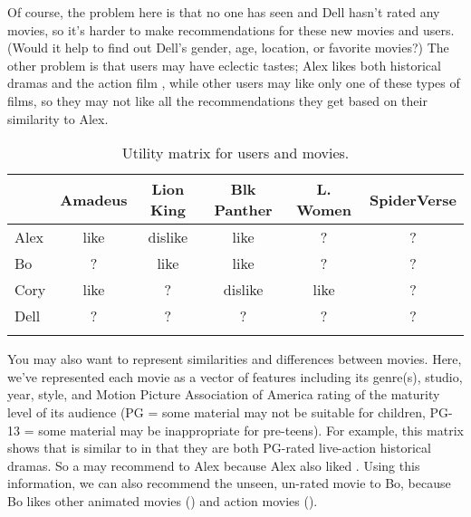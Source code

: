 Of course, the problem here is that no one has seen  and Dell hasn't rated any movies, so it's harder to make recommendations for these new movies and users.  (Would it help to find out Dell's gender, age, location, or favorite movies?) The other problem is that users may have eclectic tastes; Alex likes both historical dramas and the action film , while other users may like only one of these types of films, so they may not like all the recommendations they get based on their similarity to Alex.

\begin{table}
\begin{tabular}{l c c c c  c} 
\lsptoprule
  &  Amadeus & Lion King & Blk Panther  & L. Women & SpiderVerse  \\\midrule
Alex & like & dislike & like & ? & ? \\ 
Bo & ? & like & like & ? & ? \\ 
Cory  & like & ? & dislike & like & ? \\ 
Dell & ? & ? & ? & ? & ? \\ 
\lspbottomrule
\end{tabular}
\caption{Utility matrix for users and movies.}
\end{table}
   
  
   
 You may also want to represent similarities and differences between movies.  Here, we've represented each movie as a vector of features including its genre(s), studio, year, style, and Motion Picture Association of America rating of the maturity level of its audience (PG = some material may not be suitable for children, PG-13 = some material may be inappropriate for pre-teens).    For example, this matrix shows that  is similar to  in that they are both PG-rated live-action historical dramas.  So a  may recommend  to Alex because Alex also liked .  Using this information, we can also recommend the unseen, un-rated  movie to Bo, because Bo  likes other animated movies () and action movies  ().  


